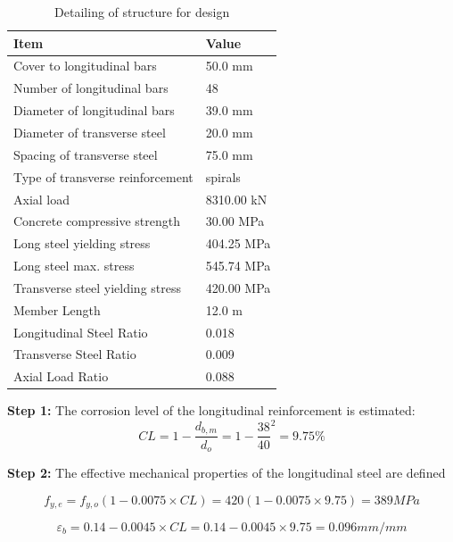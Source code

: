 \begin{table}[]
\caption{Detailing of structure for design}
\label{tab:desing_example}
\begin{center}
\begin{tabular}{ll}
Item                             & Value      \\ \hline
Cover to longitudinal bars       & 50.0 mm    \\
Number of longitudinal bars      & 48         \\
Diameter of longitudinal bars    & 39.0 mm    \\
Diameter of transverse steel     & 20.0 mm    \\
Spacing of transverse steel      & 75.0 mm    \\
Type of transverse reinforcement  & spirals    \\
Axial load                       & 8310.00 kN \\
Concrete compressive strength    & 30.00 MPa  \\
Long steel yielding stress       & 404.25 MPa \\
Long steel max. stress           & 545.74 MPa \\
Transverse steel yielding stress & 420.00 MPa \\
Member Length                    & 12.0 m \\
Longitudinal Steel Ratio         & 0.018      \\
Transverse Steel Ratio           & 0.009      \\
Axial Load Ratio                 & 0.088     
\end{tabular}
\end{center}
\end{table}

\textbf{Step 1:} The corrosion level of the longitudinal reinforcement is estimated:
\begin{displaymath}
    CL=1-\frac{d_{b,m}}{d_{o}}=1-\frac{38}{40}^2=9.75\%
\end{displaymath}

\textbf{Step 2:} The effective mechanical properties of the longitudinal steel are defined

\begin{displaymath}
    f_{y,e}=f_{y,o}(1-0.0075\times CL)=420(1-0.0075\times 9.75)=389 MPa
\end{displaymath}

\begin{displaymath}
    \varepsilon_{b}=0.14-0.0045 \times CL = 0.14-0.0045 \times 9.75 = 0.096 mm/mm
\end{displaymath}

